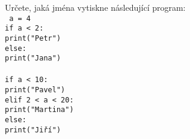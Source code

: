 \question[30]
Určete, jaká jména vytiskne následující program:\\
\texttt{
	a = 4\\
	if a < 2:\\
	\hspace*{4ex} print("Petr")\\
	else:\\
	\hspace*{4ex} print("Jana")\\
	\\
	if a < 10:\\
	\hspace*{4ex} print("Pavel")\\
	elif 2 < a < 20:\\
	\hspace*{4ex} print("Martina")\\
	else:\\
	\hspace*{4ex} print("Jiří")\\
}